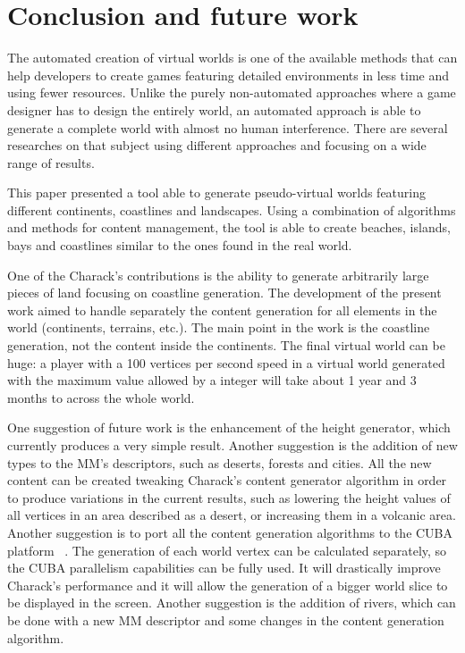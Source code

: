 \documentclass[10pt, conference, compsocconf]{IEEEtran}
\begin{document}
\section{Conclusion and future work}
\label{sec:conclusion}

The automated creation of virtual worlds is one of the available methods that can help developers to create games featuring detailed environments in less time and using fewer resources. Unlike the purely non-automated approaches where a game designer has to design the entirely world, an automated approach is able to generate a complete world with almost no human interference. There are several researches on that subject using different approaches and focusing on a wide range of results.

This paper presented a tool able to generate pseudo-virtual worlds featuring different continents, coastlines and landscapes. Using a combination of algorithms and methods for content management, the tool is able to create beaches, islands, bays and coastlines similar to the ones found in the real world.

One of the Charack's contributions is the ability to generate arbitrarily large pieces of land focusing on coastline generation. The development of the present work aimed to handle separately the content generation for all elements in the world (continents, terrains, etc.). The main point in the work is the coastline generation, not the content inside the continents. The final virtual world can be huge: a player with a 100 vertices per second speed in a virtual world generated with the maximum value allowed by a integer will take about 1 year and 3 months to across the whole world.

One suggestion of future work is the enhancement of the height generator, which currently produces a very simple result. Another suggestion is the addition of new types to the MM's descriptors, such as deserts, forests and cities. All the new content can be created tweaking Charack's content generator algorithm in order to produce variations in the current results, such as lowering the height values of all vertices in an area described as a desert, or increasing them in a volcanic area. Another suggestion is to port all the content generation algorithms to the CUBA platform ~\cite{CUDA}. The generation of each world vertex can be calculated separately, so the CUBA parallelism capabilities can be fully used. It will drastically improve Charack's performance and it will allow the generation of a bigger world slice to be displayed in the screen. Another suggestion is the addition of rivers, which can be done with a new MM descriptor and some changes in the content generation algorithm.
\end{document}
